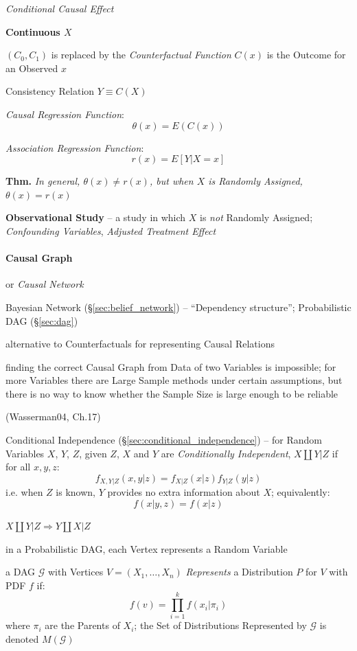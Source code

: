 \emph{Conditional Causal Effect}

\textbf{Continuous $X$}

$(C_0, C_1)$ is replaced by the \emph{Counterfactual Function} $C(x)$ is the
Outcome for an Observed $x$

Consistency Relation $Y \equiv C(X)$

\emph{Causal Regression Function}:
\[
  \theta(x) = E(C(x))
\]

\emph{Association Regression Function}:
\[
  r(x) = E[Y | X = x]
\]

\textbf{Thm.} \emph{In general, $\theta(x) \neq r(x)$, but when $X$ is Randomly
  Assigned, $\theta(x) = r(x)$}


\textbf{Observational Study} -- a study in which $X$ is \emph{not} Randomly
Assigned; \emph{Confounding Variables}, \emph{Adjusted Treatment Effect}



\paragraph{Causal Graph}\label{sec:causal_graph}\hfill

or \emph{Causal Network}

\fist Bayesian Network (\S\ref{sec:belief_network}) -- ``Dependency structure'';
Probabilistic DAG (\S\ref{sec:dag})

alternative to Counterfactuals for representing Causal Relations

finding the correct Causal Graph from Data of two Variables is impossible; for
more Variables there are Large Sample methods under certain assumptions, but
there is no way to know whether the Sample Size is large enough to be reliable

(Wasserman04, Ch.17)

Conditional Independence (\S\ref{sec:conditional_independence}) -- for Random
Variables $X$, $Y$, $Z$, given $Z$, $X$ and $Y$ are \emph{Conditionally
  Independent}, $X \coprod Y | Z$ if for all $x,y,z$:
\[
  f_{X,Y|Z}(x,y|z) = f_{X|Z}(x|z) f_{Y|Z}(y|z)
\]
i.e. when $Z$ is known, $Y$ provides no extra information about $X$;
equivalently:
\[
  f(x|y, z) = f(x|z)
\]

$X \coprod Y | Z \Rightarrow Y \coprod X | Z$

in a Probabilistic DAG, each Vertex represents a Random Variable

a DAG $\mathcal{G}$ with Vertices $V = (X_1, \ldots, X_n)$ \emph{Represents} a
Distribution $P$ for $V$ with PDF $f$ if:
\[
  f(v) = \prod_{i=1}^k f(x_i | \pi_i)
\]
where $\pi_i$ are the Parents of $X_i$; the Set of Distributions Represented by
$\mathcal{G}$ is denoted $M(\mathcal{G})$

